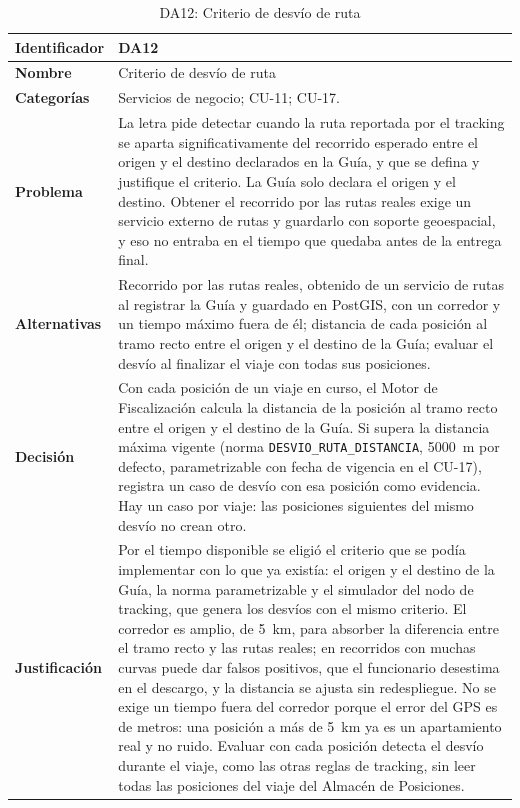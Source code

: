 \begin{table}[H]
    \small
    \centering
    \caption{DA12: Criterio de desvío de ruta}
    \label{tab:da12}
    \begin{tabular}{|p{4.1cm}|p{11.7cm}|}
        \hline
            \textbf{Identificador} & DA12 \\
        \hline
            \textbf{Nombre} & Criterio de desvío de ruta \\
        \hline
            \textbf{Categorías} & Servicios de negocio; CU-11; CU-17. \\
        \hline
            \textbf{Problema} & La letra pide detectar cuando la ruta reportada por el tracking se aparta significativamente del recorrido esperado entre el origen y el destino declarados en la Guía, y que se defina y justifique el criterio. La Guía solo declara el origen y el destino. Obtener el recorrido por las rutas reales exige un servicio externo de rutas y guardarlo con soporte geoespacial, y eso no entraba en el tiempo que quedaba antes de la entrega final. \\
        \hline
            \textbf{Alternativas} & Recorrido por las rutas reales, obtenido de un servicio de rutas al registrar la Guía y guardado en PostGIS, con un corredor y un tiempo máximo fuera de él; distancia de cada posición al tramo recto entre el origen y el destino de la Guía; evaluar el desvío al finalizar el viaje con todas sus posiciones. \\
        \hline
            \textbf{Decisión} & Con cada posición de un viaje en curso, el Motor de Fiscalización calcula la distancia de la posición al tramo recto entre el origen y el destino de la Guía. Si supera la distancia máxima vigente (norma \texttt{DESVIO\_RUTA\_DISTANCIA}, 5000~m por defecto, parametrizable con fecha de vigencia en el CU-17), registra un caso de desvío con esa posición como evidencia. Hay un caso por viaje: las posiciones siguientes del mismo desvío no crean otro. \\
        \hline
            \textbf{Justificación} & Por el tiempo disponible se eligió el criterio que se podía implementar con lo que ya existía: el origen y el destino de la Guía, la norma parametrizable y el simulador del nodo de tracking, que genera los desvíos con el mismo criterio. El corredor es amplio, de 5~km, para absorber la diferencia entre el tramo recto y las rutas reales; en recorridos con muchas curvas puede dar falsos positivos, que el funcionario desestima en el descargo, y la distancia se ajusta sin redespliegue. No se exige un tiempo fuera del corredor porque el error del GPS es de metros: una posición a más de 5~km ya es un apartamiento real y no ruido. Evaluar con cada posición detecta el desvío durante el viaje, como las otras reglas de tracking, sin leer todas las posiciones del viaje del Almacén de Posiciones. \\

\end{tabular}
\end{table}
